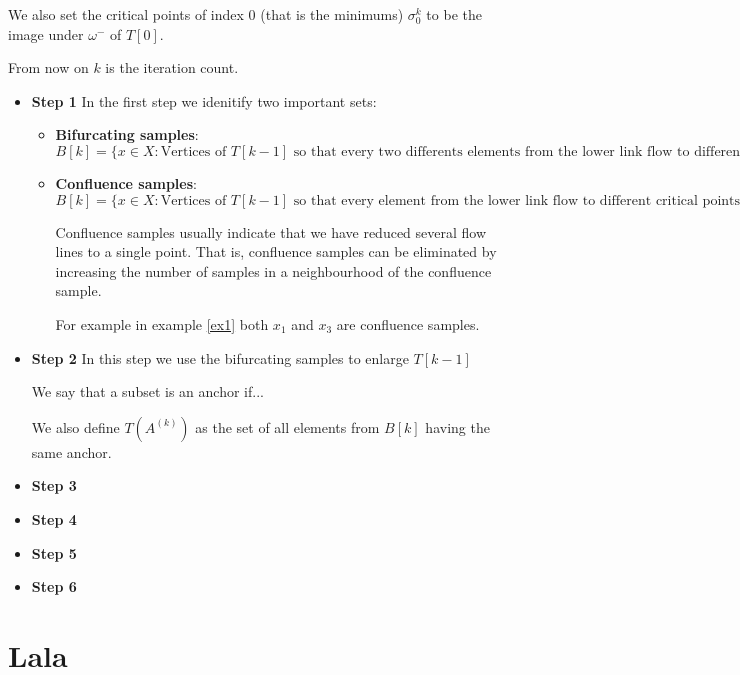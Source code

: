 We also set the critical points of index $0$ (that is the minimums) 
$\sigma_0^k$ to be the image under $\omega^-$
of $T[0]$.

    From now on $k$ is the iteration count.
\begin{itemize}

    \item {\bf Step 1}
        In the first step we idenitify two important sets:
        
        \begin{itemize}
            \item {\bf Bifurcating samples}: 
                $
                B[k]
                =\{
                    x\in X: \text{
                        Vertices of } T[k-1] \text{ so that every two differents elements
                        from the lower link flow to different critical points
                    }
                \}
                $
            \item {\bf Confluence samples}: 
                $
                B[k]
                =\{
                    x\in X: \text{
                        Vertices of } T[k-1] \text{ so that every element
                        from the lower link flow to different critical points
                    }
                \}
                $

                Confluence samples usually indicate that we have reduced several flow lines
                to a single point. That is, confluence samples can be eliminated by increasing the number of samples in a neighbourhood of the confluence
                sample.

                For example in example \ref{ex1} both $x_1$ and $x_3$ are confluence samples.
        \end{itemize}


    \item {\bf Step 2}
        In this step we use the bifurcating samples to enlarge $T[k-1]$

        \begin{definition}[Anchor]
            We say that a subset is an anchor if...
        \end{definition}

        We also define $T(A^(k))$ as the set of all elements from $B[k]$ having the same anchor.       

    \item {\bf Step 3}
        
    \item {\bf Step 4}

    \item {\bf Step 5}

    \item {\bf Step 6}

\end{itemize}


\section{Lala}
